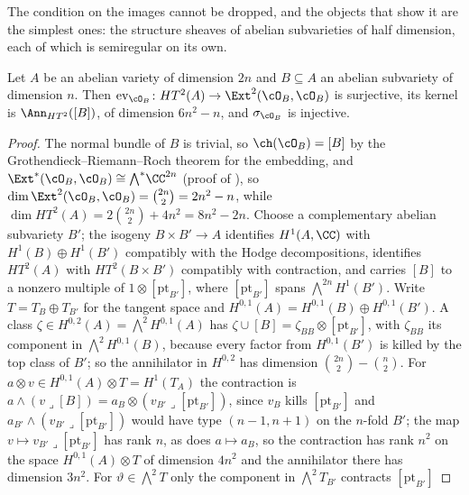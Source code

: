 The condition on the images cannot be dropped, and the objects that show it
are the simplest ones: the structure sheaves of abelian subvarieties of half
dimension, each of which is semiregular on its own.

\begin{lemma}
\label{lem:absemireg}
Let $A$ be an abelian variety of dimension $2n$ and $B\subseteq A$ an abelian
subvariety of dimension $n$. Then $\operatorname{ev}_{\cO_{B}}\colon
HT^{2}(A)\to\Ext^{2}(\cO_{B},\cO_{B})$ is surjective, its kernel is
$\Ann_{HT^{2}}([B])$, of dimension $6n^{2}-n$, and $\sigma_{\cO_{B}}$ is
injective.
\end{lemma}

\begin{proof}
The normal bundle of $B$ is trivial, so $\ch(\cO_{B})=[B]$ by the
Grothendieck--Riemann--Roch theorem for the embedding, and
$\Ext^{*}(\cO_{B},\cO_{B})\cong{\textstyle\bigwedge^{*}}\CC^{2n}$ (proof of
), so $\dim\Ext^{2}(\cO_{B},\cO_{B})=\binom{2n}{2}
=2n^{2}-n$, while $\dim HT^{2}(A)=2\binom{2n}{2}+4n^{2}=8n^{2}-2n$. Choose a
complementary abelian subvariety $B'$; the isogeny $B\times B'\to A$
identifies $H^{1}(A,\CC)$ with $H^{1}(B)\oplus H^{1}(B')$ compatibly with the
Hodge decompositions, identifies $HT^{2}(A)$ with $HT^{2}(B\times B')$
compatibly with contraction, and carries $[B]$ to a nonzero multiple of
$1\otimes[\mathrm{pt}_{B'}]$, where $[\mathrm{pt}_{B'}]$ spans
${\textstyle\bigwedge^{2n}}H^{1}(B')$. Write $T=T_{B}\oplus T_{B'}$ for the
tangent space and $H^{0,1}(A)=H^{0,1}(B)\oplus H^{0,1}(B')$. A class
$\zeta\in H^{0,2}(A)={\textstyle\bigwedge^{2}}H^{0,1}(A)$ has
$\zeta\cup[B]=\zeta_{BB}\otimes[\mathrm{pt}_{B'}]$, with $\zeta_{BB}$ its
component in ${\textstyle\bigwedge^{2}}H^{0,1}(B)$, because every factor from
$H^{0,1}(B')$ is killed by the top class of $B'$; so the annihilator in
$H^{0,2}$ has dimension $\binom{2n}{2}-\binom{n}{2}$. For $a\otimes v\in
H^{0,1}(A)\otimes T=H^{1}(T_{A})$ the contraction is $a\wedge(v\lrcorner[B])
=a_{B}\otimes(v_{B'}\lrcorner[\mathrm{pt}_{B'}])$, since $v_{B}$ kills
$[\mathrm{pt}_{B'}]$ and $a_{B'}\wedge(v_{B'}\lrcorner[\mathrm{pt}_{B'}])$
would have type $(n-1,n+1)$ on the $n$-fold $B'$; the map
$v\mapsto v_{B'}\lrcorner[\mathrm{pt}_{B'}]$ has rank $n$, as does
$a\mapsto a_{B}$, so the contraction has rank $n^{2}$ on the space
$H^{0,1}(A)\otimes T$ of dimension $4n^{2}$ and the annihilator there has
dimension $3n^{2}$. For $\vartheta\in{\textstyle\bigwedge^{2}}T$ only the
component in ${\textstyle\bigwedge^{2}}T_{B'}$ contracts $[\mathrm{pt}_{B'}]$

\end{proof}
